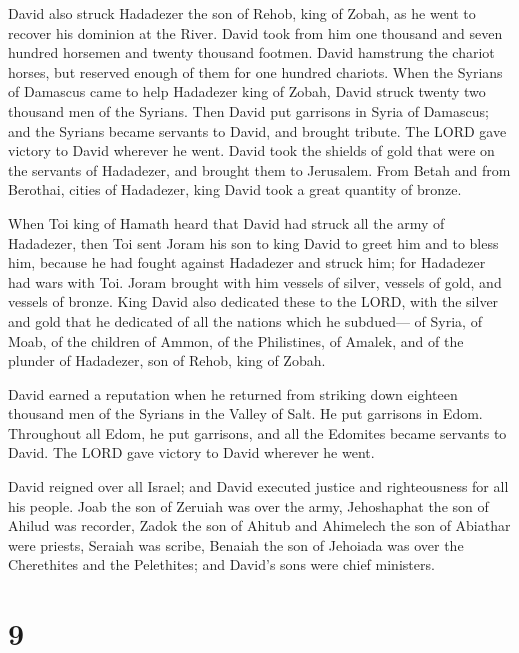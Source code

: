  David also struck Hadadezer the son of Rehob, king of
Zobah, as he went to recover his dominion at the River. 
David took from him one thousand and seven hundred horsemen and twenty
thousand footmen. David hamstrung the chariot horses, but reserved
enough of them for one hundred chariots.  When the Syrians
of Damascus came to help Hadadezer king of Zobah, David struck twenty
two thousand men of the Syrians.  Then David put garrisons
in Syria of Damascus; and the Syrians became servants to David, and
brought tribute. The LORD gave victory to David wherever he went.
 David took the shields of gold that were on the servants
of Hadadezer, and brought them to Jerusalem.  From Betah
and from Berothai, cities of Hadadezer, king David took a great quantity
of bronze.

 When Toi king of Hamath heard that David had struck all
the army of Hadadezer,  then Toi sent Joram his son to
king David to greet him and to bless him, because he had fought against
Hadadezer and struck him; for Hadadezer had wars with Toi. Joram brought
with him vessels of silver, vessels of gold, and vessels of bronze.
 King David also dedicated these to the LORD, with the
silver and gold that he dedicated of all the nations which he subdued---
 of Syria, of Moab, of the children of Ammon, of the
Philistines, of Amalek, and of the plunder of Hadadezer, son of Rehob,
king of Zobah.

 David earned a reputation when he returned from striking
down eighteen thousand men of the Syrians in the Valley of Salt.
 He put garrisons in Edom. Throughout all Edom, he put
garrisons, and all the Edomites became servants to David. The LORD gave
victory to David wherever he went.

 David reigned over all Israel; and David executed
justice and righteousness for all his people.  Joab the
son of Zeruiah was over the army, Jehoshaphat the son of Ahilud was
recorder,  Zadok the son of Ahitub and Ahimelech the son
of Abiathar were priests, Seraiah was scribe,  Benaiah
the son of Jehoiada was over the Cherethites and the Pelethites; and
David's sons were chief ministers.

\hypertarget{section-8}{%
\section{9}\label{section-8}}

